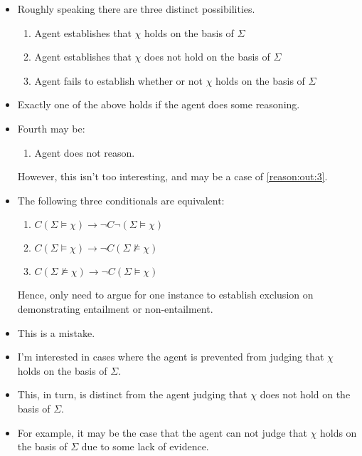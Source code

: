 \documentclass[10pt]{article}
\begin{document}
\begin{itemize}
\item Roughly speaking there are three distinct possibilities.
  \begin{enumerate}
  \item\label{reason:out:1} Agent establishes that \(\chi\) holds on the basis of \(\Sigma\)
  \item\label{reason:out:2} Agent establishes that \(\chi\) does not hold on the basis of \(\Sigma\)
  \item\label{reason:out:3} Agent fails to establish whether or not \(\chi\) holds on the basis of \(\Sigma\)
  \end{enumerate}
\item Exactly one of the above holds if the agent does some reasoning.
\item Fourth may be:
  \begin{enumerate}[resume]
  \item Agent does not reason.
  \end{enumerate}
  However, this isn't too interesting, and may be a case of \ref{reason:out:3}.
\end{itemize}

\begin{itemize}
\item The following three conditionals are equivalent:
  \begin{enumerate}
  \item \(C(\Sigma \vDash \chi) \rightarrow \lnot C \lnot (\Sigma \vDash \chi)\)
  \item \(C(\Sigma \vDash \chi) \rightarrow \lnot C (\Sigma \nvDash \chi)\)
  \item \(C(\Sigma \nvDash \chi) \rightarrow \lnot C (\Sigma \vDash \chi)\)
  \end{enumerate}
  Hence, only need to argue for one instance to establish exclusion on demonstrating entailment or non-entailment.
\end{itemize}

\begin{itemize}
\item This is a mistake.
\item I'm interested in cases where the agent is prevented from judging that \(\chi\) holds on the basis of \(\Sigma\).
\item This, in turn, is distinct from the agent judging that \(\chi\) does not hold on the basis of \(\Sigma\).
\item For example, it may be the case that the agent can not judge that \(\chi\) holds on the basis of \(\Sigma\) due to some lack of evidence.
\end{itemize}
\end{document}
